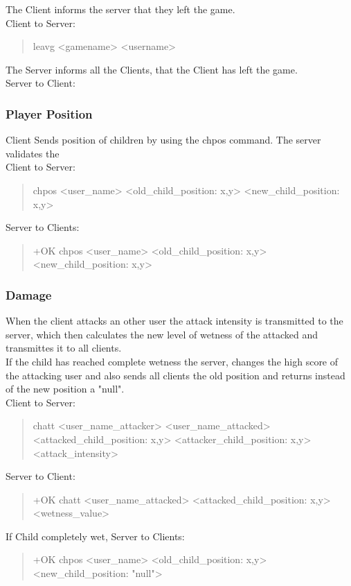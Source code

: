 \documentclass[a4paper,11pt]{article}
\begin{document}
\noindent
The Client informs the server that they left the game.\\
Client to Server:
\begin{quote}
  leavg <gamename> <username>
\end{quote}

\noindent
The Server informs all the Clients, that the Client has left the game.\\
Server to Client:


\subsubsection{Player Position}
Client Sends position of children by using the chpos command. The server validates the \\
Client to Server:
\begin{quote}
  chpos <user\_name> <old\_child\_position: x,y> <new\_child\_position: x,y>
\end{quote}
\noindent
Server to Clients:
\begin{quote}
  +OK chpos <user\_name> <old\_child\_position: x,y> <new\_child\_position: x,y>
\end{quote}
\clearpage  
\subsubsection{Damage}
When the client attacks an other user the attack intensity is transmitted to the server, which then calculates the new level of wetness of the attacked and transmittes it to all clients.\\
If the child has reached complete wetness the server, changes the high score of the attacking user and also sends all clients the old position and returns instead of the new position a "null".\\
Client to Server:
\begin{quote}
  chatt <user\_name\_attacker> <user\_name\_attacked> <attacked\_child\_position: x,y> <attacker\_child\_position: x,y> <attack\_intensity>
\end{quote}
\noindent
Server to Client:
\begin{quote}
  +OK chatt <user\_name\_attacked> <attacked\_child\_position: x,y> <wetness\_value>
\end{quote}
\noindent
If Child  completely wet, Server to Clients:
\begin{quote}
  +OK chpos <user\_name> <old\_child\_position: x,y> <new\_child\_position: "null">
\end{quote}
\end{document}

